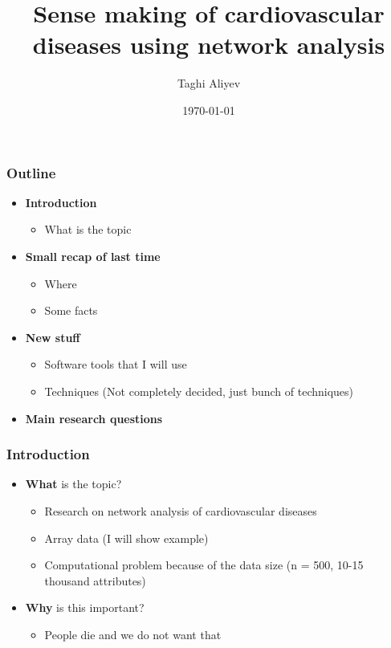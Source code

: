 \documentclass{beamer}
\title[Short title]{Sense making of cardiovascular diseases using network analysis} %
\author{Taghi Aliyev} %
\institute[MUMC+] %
{
MUMC+ \\ %
\medskip
\textit{taghialiyev@gmail.com} %
}
\date{\today} %
\begin{document}
\begin{frame}
\titlepage %
\end{frame}


\begin{frame}
\frametitle{Outline}
\begin{itemize}
\item \textbf{Introduction}
	\begin{itemize}
		\item What is the topic
	\end{itemize}
	\vspace{1mm}
\item \textbf{Small recap of last time}
	\begin{itemize}
		\item Where
		\item Some facts
	\end{itemize}
	\vspace{1mm}
\item \textbf{New stuff}
	\begin{itemize}
		\item Software tools that I will use
		\item Techniques (Not completely decided, just bunch of techniques)
	\end{itemize}
\vspace{1mm}
\item \textbf{Main research questions}
\vspace{1mm}
\end{itemize}
\end{frame}

\begin{frame}
\frametitle{Introduction}
\begin{itemize}
\item \textbf{What} is the topic?
	\begin{itemize}
		\item Research on network analysis of cardiovascular diseases
		\item Array data (I will show example)
		\item Computational problem because of the data size (n = 500, 10-15 thousand attributes)
	\end{itemize}
	\vspace{1mm}
\item \textbf{Why} is this important?
	\begin{itemize}
		\item People die and we do not want that
	\end{itemize}
\end{itemize}
\end{frame}
\end{document}
